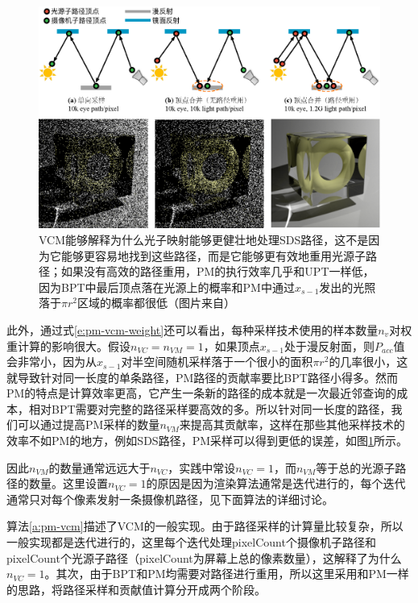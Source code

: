 \begin{figure}
\begin{fullwidth}
	\includegraphics[width=\thewidth]{figures/pm/path-reuse}
	\caption{VCM能够解释为什么光子映射能够更健壮地处理SDS路径，这不是因为它能够更容易地找到这些路径，而是它能够更有效地重用光源子路径；如果没有高效的路径重用，PM的执行效率几乎和UPT一样低，因为BPT中最后顶点落在光源上的概率和PM中通过$x_{s-1}$发出的光照落于$\pi r^{2}$区域的概率都很低（图片来自\cite{a:LightTransportSimulationwithVertexConnectionandMerging}）}
	\label{f:pm-path-reuse}
\end{fullwidth}
\end{figure}

此外，通过式\ref{e:pm-vcm-weight}还可以看出，每种采样技术使用的样本数量$n_v$对权重计算的影响很大。假设$n_{VC}=n_{VM}=1$，如果顶点$x_{s-1}$处于漫反射面，则$P_{acc}$值会非常小，因为从$x_{s-1}$对半空间随机采样落于一个很小的面积$\pi r^{2}$的几率很小，这就导致针对同一长度的单条路径，PM路径的贡献率要比BPT路径小得多。然而PM的特点是计算效率更高，它产生一条新的路径的成本就是一次最近邻查询的成本，相对BPT需要对完整的路径采样要高效的多。所以针对同一长度的路径，我们可以通过提高PM采样的数量$n_{VM}$来提高其贡献率，这样在那些其他采样技术的效率不如PM的地方，例如SDS路径，PM采样可以得到更低的误差，如图\ref{f:pm-path-reuse}所示。

因此$n_{VM}$的数量通常远远大于$n_{VC}$，实践中常设$n_{VC}=1$，而$n_{VM}$等于总的光源子路径的数量。这里设置$n_{VC}=1$的原因是因为渲染算法通常是迭代进行的，每个迭代通常只对每个像素发射一条摄像机路径，见下面算法的详细讨论。

算法\ref{a:pm-vcm}描述了VCM的一般实现。由于路径采样的计算量比较复杂，所以一般实现都是迭代进行的，这里每个迭代处理pixelCount个摄像机子路径和pixelCount个光源子路径（pixelCount为屏幕上总的像素数量），这解释了为什么$n_{VC}=1$。其次，由于BPT和PM均需要对路径进行重用，所以这里采用和PM一样的思路，将路径采样和贡献值计算分开成两个阶段。

